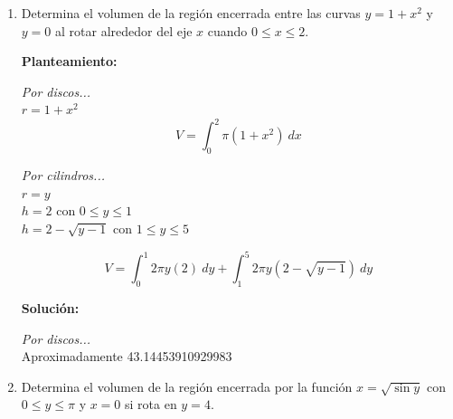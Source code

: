 \documentclass[10pt,letterpaper]{article}
\begin{document}
\begin{enumerate}
\item Determina el volumen de la región encerrada entre las curvas $y = 1 + x^2$ y $y = 0$ al rotar
      alrededor del eje $x$ cuando $0 \leq x \leq 2$.

\begin{multicols}{2}


\textbf{Planteamiento:}

\textit{Por discos...} \\
$r = 1+x^2$ \\
$$V = \int_{0}^{2} \pi (1+x^2)\ dx$$

\textit{Por cilindros...} \\
$r = y$ \\
$h = 2$ con $0 \leq y \leq 1$ \\
$h = 2 - \sqrt{y-1}$ con $1 \leq y \leq 5$

$$V = \int_{0}^{1} 2\pi y (2)\ dy + \int_{1}^{5} 2\pi y (2-\sqrt{y-1})\ dy$$

\textbf{Solución:}

\textit{Por discos...} \\
Aproximadamente 43.14453910929983

\end{multicols}

\item Determina el volumen de la región encerrada por la función $x = \sqrt{\sin y}$ con
      $0 \leq y \leq \pi$ y $x = 0$ si rota en $y = 4$.


\end{enumerate}
\end{document}

